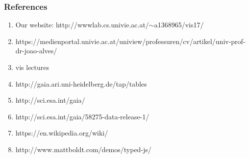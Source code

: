 \documentclass{article}
\begin{document}
\subsubsection {References}
\begin{enumerate}
    \item Our website: http://wwwlab.cs.univie.ac.at/$\sim$a1368965/vis17/

\item https://medienportal.univie.ac.at/uniview/professuren/cv/artikel/univ-prof-dr-joao-alves/
\item vis lectures
\item http://gaia.ari.uni-heidelberg.de/tap/tables
\item http://sci.esa.int/gaia/
\item http://sci.esa.int/gaia/58275-data-release-1/
\item https://en.wikipedia.org/wiki/
\item http://www.mattboldt.com/demos/typed-js/


\end{enumerate}
\end{document}
